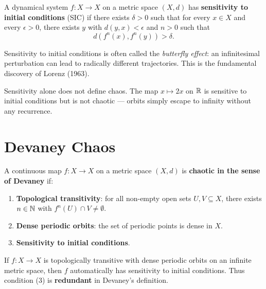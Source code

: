 \begin{definition}
A dynamical system $f : X \to X$ on a metric space $(X, d)$ has
\textbf{sensitivity to initial conditions} (SIC) if there exists $\delta > 0$
such that for every $x \in X$ and every $\epsilon > 0$, there exists $y$ with
$d(y, x) < \epsilon$ and $n > 0$ such that
\[
    d(f^n(x), f^n(y)) > \delta.
\]
\end{definition}

\begin{intuition}
Sensitivity to initial conditions is often called the \emph{butterfly effect}:
an infinitesimal perturbation can lead to radically different trajectories.
This is the fundamental discovery of Lorenz (1963).
\end{intuition}

\begin{remark}
Sensitivity alone does not define chaos. The map $x \mapsto 2x$ on $\mathbb{R}$ is
sensitive to initial conditions but is not chaotic --- orbits simply escape
to infinity without any recurrence.
\end{remark}

\section{Devaney Chaos}

\begin{definition}
\label{def:devaney}
A continuous map $f : X \to X$ on a metric space $(X, d)$ is
\textbf{chaotic in the sense of Devaney} if:
\begin{enumerate}
    \item \textbf{Topological transitivity}: for all non-empty open sets
    $U, V \subseteq X$, there exists $n \in \mathbb{N}$ with $f^n(U) \cap V \neq \emptyset$.
    \item \textbf{Dense periodic orbits}: the set of periodic points is dense in $X$.
    \item \textbf{Sensitivity to initial conditions}.
\end{enumerate}
\end{definition}

\begin{theorem}[Banks et al., 1992]
If $f : X \to X$ is topologically transitive with dense periodic orbits on an
infinite metric space, then $f$ automatically has sensitivity to initial
conditions. Thus condition (3) is \textbf{redundant} in Devaney's definition.
\end{theorem}

